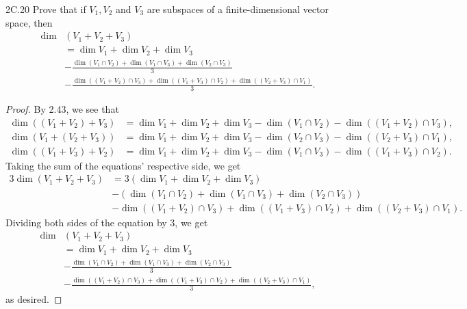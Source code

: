 \documentclass{exam}
\begin{document}
\begin{problem}{2C.20}
    Prove that if $V_1, V_2$ and $V_3$ are subspaces of a finite-dimensional vector space, then
    \begin{align*}
        \dim&(V_1 + V_2 + V_3)\\
        &=\dim V_1 + \dim V_2 + \dim V_3\\
        &-\frac{\dim(V_1\cap V_2) + \dim(V_1\cap V_3) + \dim(V_2\cap V_3)}3\\
        &-\frac{\dim((V_1 + V_2)\cap V_3) + \dim((V_1+ V_3) \cap V_2) + \dim((V_2+ V_3)\cap V_1)}3.
    \end{align*}
\end{problem}

\begin{proof}
    By 2.43, we see that
    \begin{align*}
        \dim((V_1 + V_2) + V_3) &= \dim V_1 + \dim V_2 + \dim V_3 - \dim(V_1 \cap V_2) - \dim((V_1 + V_2) \cap V_3),\\
        \dim(V_1 + (V_2 + V_3)) &= \dim V_1 + \dim V_2 + \dim V_3 - \dim(V_2 \cap V_3) - \dim((V_2 + V_3) \cap V_1),\\
        \dim((V_1 + V_3) + V_2) &= \dim V_1 + \dim V_2 + \dim V_3 - \dim(V_1 \cap V_3) - \dim((V_1 + V_3) \cap V_2).
    \end{align*}
    Taking the sum of the equations' respective side, we get
    \begin{align*}
        3\dim(V_1 + V_2 + V_3) &= 3(\dim V_1 + \dim V_2 + \dim V_3)\\
        &-(\dim(V_1\cap V_2) + \dim(V_1\cap V_3) + \dim(V_2\cap V_3))\\
        &-\dim((V_1 + V_2)\cap V_3) + \dim((V_1+ V_3) \cap V_2) + \dim((V_2+ V_3)\cap V_1).
    \end{align*}
    Dividing both sides of the equation by $3$, we get
    \begin{align*}
        \dim&(V_1 + V_2 + V_3)\\
        &=\dim V_1 + \dim V_2 + \dim V_3\\
        &-\frac{\dim(V_1\cap V_2) + \dim(V_1\cap V_3) + \dim(V_2\cap V_3)}3\\
        &-\frac{\dim((V_1 + V_2)\cap V_3) + \dim((V_1+ V_3) \cap V_2) + \dim((V_2+ V_3)\cap V_1)}3,
    \end{align*}
    as desired.
\end{proof}
\end{document}
